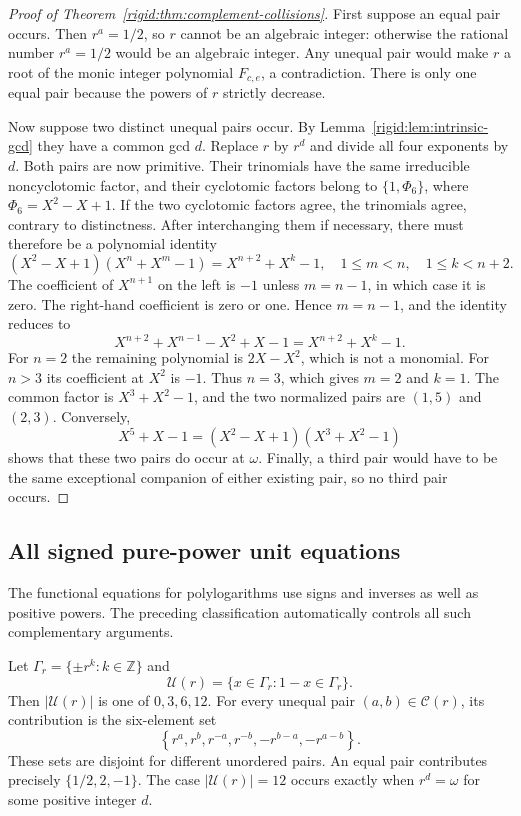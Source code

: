\begin{proof}[Proof of Theorem~\ref{rigid:thm:complement-collisions}]
First suppose an equal pair occurs.  Then $r^a=1/2$, so $r$ cannot
be an algebraic integer: otherwise the rational number $r^a=1/2$
would be an algebraic integer.  Any unequal pair would make $r$ a
root of the monic integer polynomial $F_{c,e}$, a contradiction.
There is only one equal pair because the powers of $r$ strictly
decrease.

Now suppose two distinct unequal pairs occur.  By
Lemma~\ref{rigid:lem:intrinsic-gcd} they have a common gcd $d$.
Replace $r$ by $r^d$ and divide all four exponents by $d$.
Both pairs are now primitive.  Their trinomials have the same
irreducible noncyclotomic factor, and their cyclotomic factors belong
to $\{1,\Phi_6\}$, where $\Phi_6=X^2-X+1$.
If the two cyclotomic factors agree, the trinomials agree, contrary
to distinctness.  After interchanging them if necessary, there must
therefore be a polynomial identity
\begin{equation}
(X^2-X+1)(X^n+X^m-1)=X^{n+2}+X^k-1,
\quad 1\le m<n,\quad 1\le k<n+2.
\label{rigid:eq:primitive-collision-factor}
\end{equation}
The coefficient of $X^{n+1}$ on the left is $-1$ unless
$m=n-1$, in which case it is zero.  The right-hand coefficient is
zero or one.  Hence $m=n-1$, and the identity reduces to
\[
X^{n+2}+X^{n-1}-X^2+X-1=X^{n+2}+X^k-1.
\]
For $n=2$ the remaining polynomial is $2X-X^2$, which is not a
monomial.  For $n>3$ its coefficient at $X^2$ is $-1$.
Thus $n=3$, which gives $m=2$ and $k=1$.
The common factor is $X^3+X^2-1$, and the two normalized pairs are
$(1,5)$ and $(2,3)$.  Conversely,
\[
X^5+X-1=(X^2-X+1)(X^3+X^2-1)
\]
shows that these two pairs do occur at $\omega$.
Finally, a third pair would have to be the same exceptional companion
of either existing pair, so no third pair occurs.
\end{proof}

\subsection{All signed pure-power unit equations}

The functional equations for polylogarithms use signs and inverses as
well as positive powers.  The preceding classification automatically
controls all such complementary arguments.

\begin{corollary}
\label{rigid:cor:signed-unit-count}
Let $\Gamma_r=\{\pm r^k:k\in\mathbb Z\}$ and
\[
\mathcal U(r)=\{x\in\Gamma_r:1-x\in\Gamma_r\}.
\]
Then $|\mathcal U(r)|$ is one of $0,3,6,12$.
For every unequal pair $(a,b)\in\mathcal C(r)$, its contribution is
the six-element set
\begin{equation}
\left\{r^a,r^b,r^{-a},r^{-b},-r^{b-a},-r^{a-b}\right\}.
\label{rigid:eq:six-unit-orbit}
\end{equation}
These sets are disjoint for different unordered pairs.
An equal pair contributes precisely $\{1/2,2,-1\}$.
The case $|\mathcal U(r)|=12$ occurs exactly when $r^d=\omega$
for some positive integer $d$.
\end{corollary}

